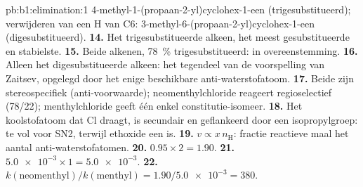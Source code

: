 \begin{solution}{pb:b1:elimination:1}
4-methyl-1-(propaan-2-yl)cyclohex-1-een (trigesubstitueerd); verwijderen
van een H van C6: 3-methyl-6-(propaan-2-yl)cyclohex-1-een
(digesubstitueerd).
\textbf{14.} Het trigesubstitueerde alkeen, het meest gesubstitueerde en
stabielste.
\textbf{15.} Beide alkenen, \qty{78}{\percent} trigesubstitueerd: in
overeenstemming.
\textbf{16.} Alleen het digesubstitueerde alkeen: het tegendeel van de
voorspelling van Zaitsev, opgelegd door het enige beschikbare
anti-waterstofatoom.
\textbf{17.} Beide zijn stereospecifiek (anti-voorwaarde);
neomenthylchloride reageert regioselectief (78/22); menthylchloride geeft
één enkel constitutie-isomeer.
\textbf{18.} Het koolstofatoom dat Cl draagt, is secundair en geflankeerd
door een isopropylgroep: te vol voor SN2, terwijl ethoxide een  is.
\textbf{19.} $v \propto x\,n_{\mathrm{H}}$: fractie reactieve  maal
het aantal anti-waterstofatomen.
\textbf{20.} $0.95 \times 2 = 1.90$.
\textbf{21.} $\num{5.0e-3} \times 1 = \num{5.0e-3}$.
\textbf{22.} \textbf{$k(\text{neomenthyl})/k(\text{menthyl}) = 1.90/\num{5.0e-3}
= 380$}.
\end{solution}
